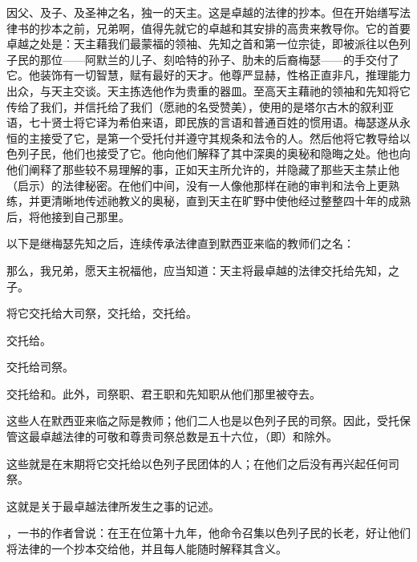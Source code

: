 因父、及子、及圣神之名，独一的天主。这是卓越的法律的抄本。但在开始缮写法律书的抄本之前，兄弟啊，值得先就它的卓越和其安排的高贵来教导你。它的首要卓越之处是：天主藉我们最蒙福的领袖、先知之首和第一位宗徒，即被派往以色列子民的那位——阿默兰的儿子、刻哈特的孙子、肋未的后裔梅瑟——的手交付了它。他装饰有一切智慧，赋有最好的天才。他尊严显赫，性格正直非凡，推理能力出众，与天主交谈。天主拣选他作为贵重的器皿。至高天主藉祂的领袖和先知将它传给了我们，并信托给了我们（愿祂的名受赞美），使用的是塔尔古木的叙利亚语，七十贤士将它译为希伯来语，即民族的言语和普通百姓的惯用语。梅瑟遂从永恒的主接受了它，是第一个受托付并遵守其规条和法令的人。然后他将它教导给以色列子民，他们也接受了它。他向他们解释了其中深奥的奥秘和隐晦之处。他也向他们阐释了那些较不易理解的事，正如天主所允许的，并隐藏了那些天主禁止他（启示）的法律秘密。在他们中间，没有一人像他那样在祂的审判和法令上更熟练，并更清晰地传述祂教义的奥秘，直到天主在旷野中使他经过整整四十年的成熟后，将他接到自己那里。\par

以下是继梅瑟先知之后，连续传承法律直到默西亚来临的教师们之名：\par

那么，我兄弟，愿天主祝福他，应当知道：天主将最卓越的法律交托给先知，之子。\par

将它交托给大司祭，交托给，交托给。\par

交托给。\par

交托给司祭。\par

交托给和。此外，司祭职、君王职和先知职从他们那里被夺去。\par

这些人在默西亚来临之际是教师；他们二人也是以色列子民的司祭。因此，受托保管这最卓越法律的可敬和尊贵司祭总数是五十六位，（即）和除外。\par

这些就是在末期将它交托给以色列子民团体的人；在他们之后没有再兴起任何司祭。\par

这就是关于最卓越法律所发生之事的记述。\par

，一书的作者曾说：在王在位第十九年，他命令召集以色列子民的长老，好让他们将法律的一个抄本交给他，并且每人能随时解释其含义。\par

